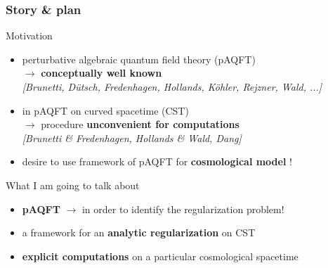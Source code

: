 \documentclass[9pt]{beamer}
\newcommand{\citebeam}[1]{\textit{\textcolor{black!60!white}{[#1]}}}
\begin{document}
\begin{frame}

\frametitle{Story \& plan}

\begin{exampleblock}{Motivation}
%
\begin{itemize}
\vspace*{-8pt}    
\item perturbative algebraic quantum field theory (pAQFT) \\
\vspace*{-2pt}
$\to$ \textbf{conceptually well known} \\
\vspace*{-2pt}
\citebeam{Brunetti, Dütsch, Fredenhagen, Hollands, K\"ohler, Rejzner, Wald, ...} \\

\vspace*{-8pt}
\item in pAQFT on curved spacetime (CST) \\
$\to$ procedure \textbf{unconvenient for computations} \\
\vspace*{-2pt}
\citebeam{Brunetti \& Fredenhagen, Hollands \& Wald, Dang} \\
    
\vspace*{-8pt}    
\item desire to use framework of pAQFT for \textbf{cosmological model} ! 
\vspace*{-2pt}  
\end{itemize}
%
\end{exampleblock}

\vfill

\begin{exampleblock}{What I am going to talk about}
\begin{itemize}
\vspace*{-8pt}   
\item \textbf{pAQFT} $\to$ in order to identify the regularization problem! \\

\vspace*{-8pt}
\item a framework for an \textbf{analytic regularization} on CST \\

\vspace*{-8pt}
\item \textbf{explicit computations} on a particular cosmological spacetime

\end{itemize}
\end{exampleblock}
%
\end{frame}
\end{document}
